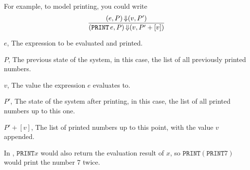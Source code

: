 For example, to model printing, you could write
\begin{equation}\label{eq:Semantic_Side_Effect_Printing}
  \frac{(e, P) \operatorname{\Downarrow} (v, P')}{(\mathtt{PRINT\,} e, P) \operatorname{\Downarrow} (v, P'+[v])}
\end{equation}
\begin{description}[noitemsep]
\item $e$, The expression to be evaluated and printed.
\item $P$, The previous state of the system, in this case, the list of all previously printed numbers.
\item $v$, The value the expression $e$ evaluates to.
\item $P'$, The state of the system after printing, in this case, the list of all printed numbers up to this one.
\item $P'+[v]$, The list of printed numbers up to this point, with the value $v$ appended.
\end{description}

\begin{remark*}
  In , $\mathtt{PRINT} x$ would also return the evaluation result of $x$, so $\mathtt{PRINT} (\mathtt{PRINT} 7)$ would print the number 7 twice.
\end{remark*}

